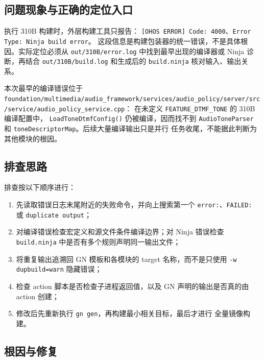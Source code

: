 \subsection{问题现象与正确的定位入口}

执行 310B 构建时，外层构建工具只报告：
\texttt{[OHOS ERROR] Code: 4000}、\texttt{Error Type: Ninja build error}。
这段信息是构建包装器的统一错误，不是具体根因。实际定位必须从
\texttt{out/310B/error.log} 中找到最早出现的编译器或 Ninja 诊断，再结合
\texttt{out/310B/build.log} 和生成后的 \texttt{build.ninja} 核对输入、输出关系。

本次最早的编译错误位于
\texttt{foundation/multimedia/audio\_framework/services/audio\_policy/server/src/service/audio\_policy\_service.cpp}：
在未定义 \texttt{FEATURE\_DTMF\_TONE} 的 310B 编译配置中，
\texttt{LoadToneDtmfConfig()} 仍被编译，因而找不到
\texttt{AudioToneParser} 和 \texttt{toneDescriptorMap}。后续大量编译输出只是并行
任务收尾，不能据此判断为其他模块的根因。

\subsection{排查思路}

排查按以下顺序进行：
\begin{enumerate}
  \item 先读取错误日志末尾附近的失败命令，并向上搜索第一个
  \texttt{error:}、\texttt{FAILED:} 或 \texttt{duplicate output}；
  \item 对编译错误检查宏定义和源文件条件编译边界；对 Ninja 错误检查
  \texttt{build.ninja} 中是否有多个规则声明同一输出文件；
  \item 将重复输出追溯回 GN 模板和各模块的 target 名称，而不是只使用
  \texttt{-w dupbuild=warn} 隐藏错误；
  \item 检查 action 脚本是否检查子进程返回值，以及 GN 声明的输出是否真的由
  action 创建；
  \item 修改后先重新执行 \texttt{gn gen}，再构建最小相关目标，最后才进行
  全量镜像构建。
\end{enumerate}

\subsection{根因与修复}


